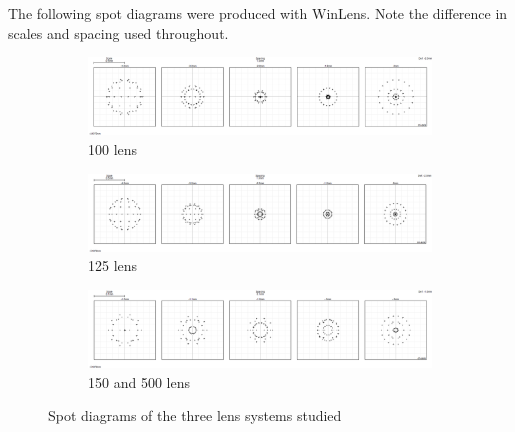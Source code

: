             The following spot diagrams were produced with WinLens. Note the difference in scales and spacing used throughout.
            \begin{figure}[!ht]
                \centering
                \begin{subfigure}[t]{\textwidth}
                    \centering
                    \includegraphics[width=\textwidth]{assets/3 design/100 lens spot diagram.png}
                    \caption{100 lens}
                \end{subfigure}
                \begin{subfigure}[t]{\textwidth}
                    \centering
                    \includegraphics[width=\textwidth]{assets/3 design/125 lens spot diagram.png}
                    \caption{125 lens}
                \end{subfigure}
                \begin{subfigure}[t]{\textwidth}
                    \centering
                    \includegraphics[width=\textwidth]{assets/3 design/500 and 150 lenses spot size.png}
                    \caption{150 and 500 lens}
                \end{subfigure}
                \caption{Spot diagrams of the three lens systems studied}
                \label{fig:spot diagrams}
            \end{figure}

